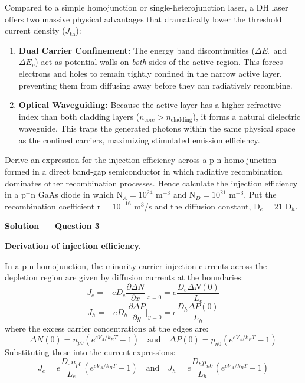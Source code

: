 Compared to a simple homojunction or single-heterojunction laser, a DH laser offers two massive physical advantages that dramatically lower the threshold current density ($J_{\text{th}}$):
\begin{enumerate}
  \item \textbf{Dual Carrier Confinement:} The energy band discontinuities ($\Delta E_c$ and $\Delta E_v$) act as potential walls on \textit{both} sides of the active region. This forces electrons and holes to remain tightly confined in the narrow active layer, preventing them from diffusing away before they can radiatively recombine.
  \item \textbf{Optical Waveguiding:} Because the active layer has a higher refractive index than both cladding layers ($n_{\text{core}} > n_{\text{cladding}}$), it forms a natural dielectric waveguide. This traps the generated photons within the same physical space as the confined carriers, maximizing stimulated emission efficiency.
\end{enumerate}


\begin{question}[Question 3]
Derive an expression for the injection efficiency across a p-n homo-junction formed in a direct band-gap semiconductor in which radiative recombination dominates other recombination processes. Hence calculate the injection efficiency in a p$^+$n GaAs diode in which N$_A = 10^{24}$ m$^{-3}$ and N$_D = 10^{21}$ m$^{-3}$. Put the recombination coefficient r = $10^{-16}$ m$^3$/s and the diffusion constant, D$_e = 21$ D$_h$.
\end{question}

\textbf{\large Solution --- Question 3}

\textbf{Derivation of injection efficiency.}

In a p-n homojunction, the minority carrier injection currents across the depletion region are given by diffusion currents at the boundaries:
\begin{equation*}
  J_e = -e D_e \frac{\partial \Delta N}{\partial x} \Big|_{x=0} = e \frac{D_e \Delta N(0)}{L_e}
\end{equation*}
\begin{equation*}
  J_h = -e D_h \frac{\partial \Delta P}{\partial y} \Big|_{y=0} = e \frac{D_h \Delta P(0)}{L_h}
\end{equation*}
where the excess carrier concentrations at the edges are:
\begin{equation*}
  \Delta N(0) = n_{p0}\left(e^{e V_A / k_B T} - 1\right) \quad \text{and} \quad \Delta P(0) = p_{n0}\left(e^{e V_A / k_B T} - 1\right)
\end{equation*}
Substituting these into the current expressions:
\begin{equation*}
  J_e = e \frac{D_e n_{p0}}{L_e}\left(e^{e V_A / k_B T} - 1\right) \quad \text{and} \quad J_h = e \frac{D_h p_{n0}}{L_h}\left(e^{e V_A / k_B T} - 1\right)
\end{equation*}

